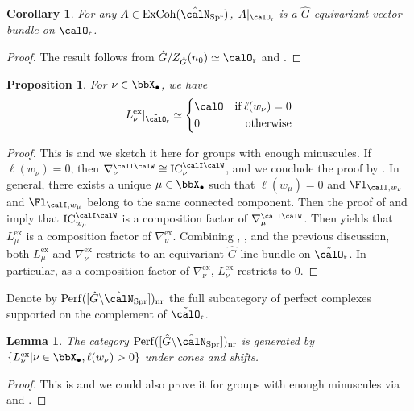 \documentclass[10pt, reqno]{amsart}
\theoremstyle{plain}
\newtheorem{proposition}[theorem]{Proposition}
\newtheorem{lemma}[theorem]{Lemma}
\newtheorem{corollary}[theorem]{Corollary}
\theoremstyle{definition}
\newcommand{\Jize}[1]{\framebox{\begin{varwidth}{0.9\textwidth} Jize: #1 \end{varwidth}}\newline}
\numberwithin{equation}{section}
\begin{document}
\begin{corollary} \label{Corollary_excoh_restricts_to_equiv_vbs}
	For any $A\in \mathrm{ExCoh}(\hat{\calN}_{\mathrm{Spr}})$, $A\vert_{\calO_\mathrm{r}}$ is a $\hat{G}$-equivariant vector bundle on $\calO_\mathrm{r}$.
\end{corollary}
\begin{proof}
	The result follows from $\hat{G}/Z_{\hat{G}}(n_0)\simeq {\calO}_\mathrm{r}$ and  .  
\end{proof}
\begin{proposition}\label{prop_rest_of_simple_ex_sheaves}
	For $\nu\in \bbX_\bullet$, we have
	\begin{equation}   L_\nu^\mathrm{ex}\vert_{\tilde{\calO}_\mathrm{r}}\simeq \left \{ \begin{aligned}  & \calO & \mathrm{ if }\,\ell(w_\nu)=0 \\
			& 0 & \mathrm{otherwise}
		\end{aligned}\right.
	\end{equation}
\end{proposition}
\begin{proof}
	This is \cite[Proposition 7.2.4]{AR} and we sketch it here for groups with enough minuscules. If $\ell(w_\nu)=0$, then $\nabla_\nu^{\calI\calW}\cong \mathrm{IC}_\nu^{\calI\calW}$, and we conclude the proof by . In general, there exists a unique $\mu\in\bbX_\bullet$ such that $\ell(w_\mu)=0$ and $\Fl_{\calI,w_\nu}$ and $\Fl_{\calI,w_\mu}$ belong to the same connected component. Then the proof of  and  imply that $\mathrm{IC}_{w_\mu}^{\calI\calW}$ is a composition factor of $\nabla_\mu^{\calI\calW}$. Then  yields that $L_\mu^\mathrm{ex}$ is a composition factor of $\nabla_\nu^\mathrm{ex}$. Combining , ,  and the previous discussion, both $L_\mu^\mathrm{ex}$ and $\nabla_\nu^\mathrm{ex}$ restricts to an equivariant $\hat{G}$-line bundle on $\tilde{\calO}_\mathrm{r}$. In particular,  as a composition factor of $\nabla_\nu^\mathrm{ex}$, $L_\nu^\mathrm{ex}$ restricts to $0$.
\end{proof}
Denote by $ \mathrm{Perf}([\hat{G}\backslash \hat{\calN}_{\mathrm{Spr}}])_{\mathrm{nr}}$ the full subcategory of perfect complexes supported on the complement of $\tilde{\calO}_\mathrm{r}$. 
\begin{lemma} \label{lemma_coh_cat_generated_by_ex_IC}
	The category $ \mathrm{Perf}([\hat{G}\backslash \hat{\calN}_{\mathrm{Spr}}])_{\mathrm{nr}}$ is generated by $\{L_\nu^\mathrm{ex}\vert \nu\in \bbX_\bullet, \ell(w_\nu)>0\}$ under cones and shifts.
\end{lemma}
\begin{proof}
	This is \cite[Lemma 7.2.7]{AR} and we could also prove it for groups with enough minuscules via  and .
\end{proof}
\end{document}
